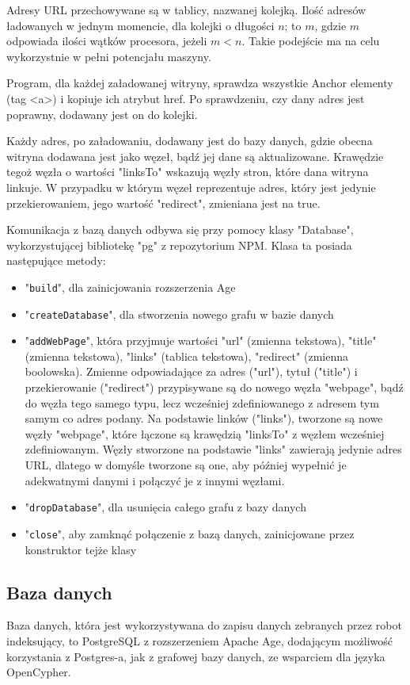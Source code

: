 \documentclass[a4paper, 12pt]{article}
\begin{document}
Adresy URL przechowywane są w tablicy, nazwanej kolejką. Ilość adresów ładowanych w jednym momencie, dla kolejki o długości \(n\); to \(m\), gdzie \(m\) odpowiada ilości wątków procesora, jeżeli \(m < n\). Takie podejście ma na celu wykorzystnie w pełni potencjału maszyny.

Program, dla każdej załadowanej witryny, sprawdza wszystkie Anchor elementy (tag <a>) i kopiuje ich atrybut href. Po sprawdzeniu, czy dany adres jest poprawny, dodawany jest on do kolejki.

Każdy adres, po załadowaniu, dodawany jest do bazy danych, gdzie obecna witryna dodawana jest jako węzeł, bądź jej dane są aktualizowane. Krawędzie tegoż węzła o wartości "linksTo" wskazują węzły stron, które dana witryna linkuje. W przypadku w którym węzeł reprezentuje adres, który jest jedynie przekierowaniem, jego wartość "redirect", zmieniana jest na true.

Komunikacja z bazą danych odbywa się przy pomocy klasy "Database", wykorzystującej bibliotekę "pg" z repozytorium NPM. Klasa ta posiada następujące metody:
\begin{itemize}
	\item "\lstinline{build}", dla zainicjowania rozszerzenia Age
	\item "\lstinline{createDatabase}", dla stworzenia nowego grafu w bazie danych
	\item "\lstinline{addWebPage}", która przyjmuje wartości "url" (zmienna tekstowa), "title" (zmienna tekstowa), "links" (tablica tekstowa), "redirect" (zmienna boolowska). Zmienne odpowiadające za adres ("url"), tytuł ("title") i przekierowanie ("redirect") przypisywane są do nowego węzła "webpage", bądź do węzła tego samego typu, lecz wcześniej zdefiniowanego z adresem tym samym co adres podany. Na podstawie linków ("links"), tworzone są nowe węzły "webpage", które łączone są krawędzią "linksTo" z węzłem wcześniej zdefiniowanym. Węzły stworzone na podstawie "links" zawierają jedynie adres URL, dlatego w domyśle tworzone są one, aby później wypełnić je adekwatnymi danymi i połączyć je z innymi węzłami.
	\item "\lstinline{dropDatabase}", dla usunięcia całego grafu z bazy danych
	\item "\lstinline{close}", aby zamknąć połączenie z bazą danych, zainicjowane przez konstruktor tejże klasy
\end{itemize}

\subsection{Baza danych}
Baza danych, która jest wykorzystywana do zapisu danych zebranych przez robot indeksujący, to PostgreSQL z rozszerzeniem Apache Age, dodającym możliwość korzystania z Postgres-a, jak z grafowej bazy danych, ze wsparciem dla języka OpenCypher.
\end{document}
